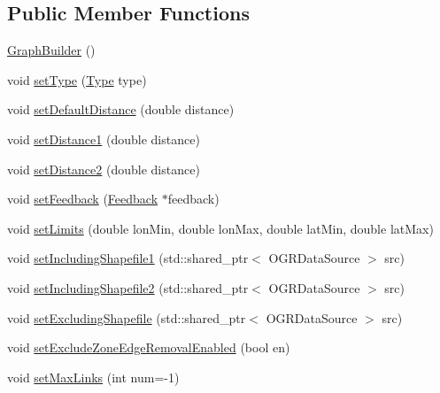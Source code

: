 \subsection*{Public Member Functions}
\begin{DoxyCompactItemize}
\item 
\mbox{\hyperlink{classdeprecated_1_1_graph_builder_a5acd0216d1c0a8818a68dfc2600c8628}{Graph\+Builder}} ()
\item 
void \mbox{\hyperlink{classdeprecated_1_1_graph_builder_a93754d040f1458a5712fffac51c279d0}{set\+Type}} (\mbox{\hyperlink{classdeprecated_1_1_graph_builder_a7f373eeb62c478a200ab1f3cfa4ef6f3}{Type}} type)
\item 
void \mbox{\hyperlink{classdeprecated_1_1_graph_builder_a00af1f2f351b3af8419a860d6c8f6399}{set\+Default\+Distance}} (double distance)
\item 
void \mbox{\hyperlink{classdeprecated_1_1_graph_builder_a92b54a0fa69a560a245255dfd22aaf04}{set\+Distance1}} (double distance)
\item 
void \mbox{\hyperlink{classdeprecated_1_1_graph_builder_a2e80b5f6298dee681a3fe3ecaa863cbb}{set\+Distance2}} (double distance)
\item 
void \mbox{\hyperlink{classdeprecated_1_1_graph_builder_a8744ac11641da820f063152927e99227}{set\+Feedback}} (\mbox{\hyperlink{classdeprecated_1_1_graph_builder_1_1_feedback}{Feedback}} $\ast$feedback)
\item 
void \mbox{\hyperlink{classdeprecated_1_1_graph_builder_a2cf6d3a1f623f8a1d6e6bf9aa805db83}{set\+Limits}} (double lon\+Min, double lon\+Max, double lat\+Min, double lat\+Max)
\item 
void \mbox{\hyperlink{classdeprecated_1_1_graph_builder_a96fe88d3e6ae20f51f824f4ca425b891}{set\+Including\+Shapefile1}} (std\+::shared\+\_\+ptr$<$ O\+G\+R\+Data\+Source $>$ src)
\item 
void \mbox{\hyperlink{classdeprecated_1_1_graph_builder_a110efa0566d9a2fd28405fe620a13453}{set\+Including\+Shapefile2}} (std\+::shared\+\_\+ptr$<$ O\+G\+R\+Data\+Source $>$ src)
\item 
void \mbox{\hyperlink{classdeprecated_1_1_graph_builder_a399b8d6e4fa64f0ece1a1fee7ad7e149}{set\+Excluding\+Shapefile}} (std\+::shared\+\_\+ptr$<$ O\+G\+R\+Data\+Source $>$ src)
\item 
void \mbox{\hyperlink{classdeprecated_1_1_graph_builder_a06827ef513fcd34245d2bd54d58c2cf0}{set\+Exclude\+Zone\+Edge\+Removal\+Enabled}} (bool en)
\item 
void \mbox{\hyperlink{classdeprecated_1_1_graph_builder_a1938adc93ebd5453515cd1b2ac377d72}{set\+Max\+Links}} (int num=-\/1)

\end{DoxyCompactItemize}

